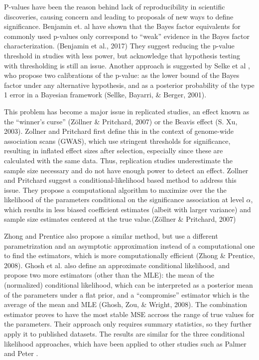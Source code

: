 \documentclass[12pt,twoside]{dukestatscithesis}
\theoremstyle{definition}
\theoremstyle{definition}
\theoremstyle{definition}
\theoremstyle{remark}
\begin{document}
P-values have been the reason behind lack of reproducibility in
scientific discoveries, causing concern and leading to proposals of new
ways to define significance. Benjamin et. al have shown that the Bayes
factor equivalents for commonly used p-values only correspond to
``weak'' evidence in the Bayes factor characterization. (Benjamin et
al., 2017) They suggest reducing the p-value threshold in studies with
less power, but acknowledge that hypothesis testing with thresholding is
still an issue. Another approach is suggested by Selke et al , who
propose two calibrations of the p-value: as the lower bound of the Bayes
factor under any alternative hypothesis, and as a posterior probability
of the type 1 error in a Bayesian framework (Sellke, Bayarri, \& Berger,
2001).

This problem has become a major issue in replicated studies, an effect
known as the ``winner's curse'' (Zöllner \& Pritchard, 2007) or the
Beavis effect (S. Xu, 2003). Zollner and Pritchard first define this in
the context of genome-wide association scans (GWAS), which use stringent
thresholds for significance, resulting in inflated effect sizes after
selection, especially since these are calculated with the same data.
Thus, replication studies underestimate the sample size necessary and do
not have enough power to detect an effect. Zollner and Pritchard suggest
a conditional-likelihood based method to address this issue. They
propose a computational algorithm to maximize over the the likelihood of
the parameters conditional on the significance association at level
\(\alpha\), which results in less biased coefficient estimates (albeit
with larger variance) and sample size estimates centered at the true
value.(Zöllner \& Pritchard, 2007)

Zhong and Prentice also propose a similar method, but use a different
parametrization and an asymptotic approximation instead of a
computational one to find the estimators, which is more computationally
efficient (Zhong \& Prentice, 2008). Ghosh et al. also define an
approximate conditional likelihood, and propose two more estimators
(other than the MLE): the mean of the (normalized) conditional
likelihood, which can be interpreted as a posterior mean of the
parameters under a flat prior, and a ``compromise'' estimator which is
the average of the mean and MLE (Ghosh, Zou, \& Wright, 2008). The
combination estimator proves to have the most stable MSE accross the
range of true values for the parameters. Their approach only requires
summary statistics, so they further apply it to published datasets. The
results are similar for the three conditional likelihood approaches,
which have been applied to other studies such as Palmer and Peter .
\end{document}
